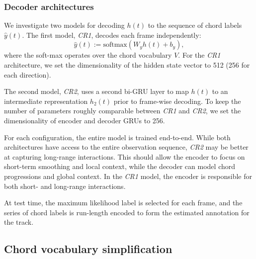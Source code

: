 \documentclass{article}
\begin{document}
\subsubsection{Decoder architectures}
We investigate two models for decoding $h(t)$ to the sequence of chord labels $\hat{y}(t)$.
The first model, \emph{CR1}, decodes each frame independently:
\begin{equation}
    \hat{y}(t) := \text{softmax}\left(W_y h(t) + b_y\right),
\end{equation}
where the soft-max operates over the chord vocabulary $V$.
For the \emph{CR1} architecture, we set the dimensionality of the hidden state vector to 512 (256 for each direction).

The second model, \emph{CR2}, uses a second bi-GRU layer to map $h(t)$ to an intermediate representation $h_2(t)$ prior to frame-wise decoding.
To keep the number of parameters roughly comparable between \emph{CR1} and \emph{CR2}, we set the dimensionality of encoder and decoder GRUs to 256.

For each configuration, the entire model is trained end-to-end.
While both architectures have access to the entire observation sequence, \emph{CR2} may be better at capturing long-range interactions.
This should allow the encoder to focus on short-term smoothing and local context, while the decoder can model chord progressions and global context.
In the \emph{CR1} model, the encoder is responsible for both short- and long-range interactions.

At test time, the maximum likelihood label is selected for each frame, and the series of chord labels is run-length encoded to form the estimated annotation for the track.


\subsection{Chord vocabulary simplification}
\end{document}
